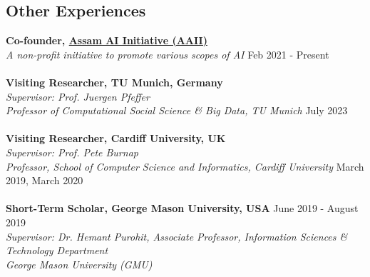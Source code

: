 \documentclass[margin, centered,lmodern]{res}
\begin{document}
\begin{resume}
\section{Other Experiences}
\textbf{Co-founder,  \href{https://aaii-axom.github.io/}{Assam AI Initiative (AAII)}} \\
\emph{A non-profit initiative to promote various scopes of AI} \hfill Feb 2021 - Present \\
\\
\textbf{Visiting Researcher, TU Munich, Germany} \\
\emph{Supervisor: Prof. Juergen Pfeffer\\ Professor of Computational Social Science \& Big Data, TU Munich} \hfill July 2023 \\
\\
\textbf{Visiting Researcher, Cardiff University, UK} \\
\emph{Supervisor: Prof. Pete Burnap \\ Professor, School of Computer Science and Informatics, Cardiff University} \hfill March 2019,  March 2020 \\
\\
\textbf{Short-Term Scholar, George Mason University, USA} \hfill June 2019 - August 2019\\
\emph{Supervisor: Dr. Hemant Purohit,  Associate Professor, Information Sciences \& Technology Department \\ George Mason University (GMU)}  \\
\\



\end{resume}
\end{document}
